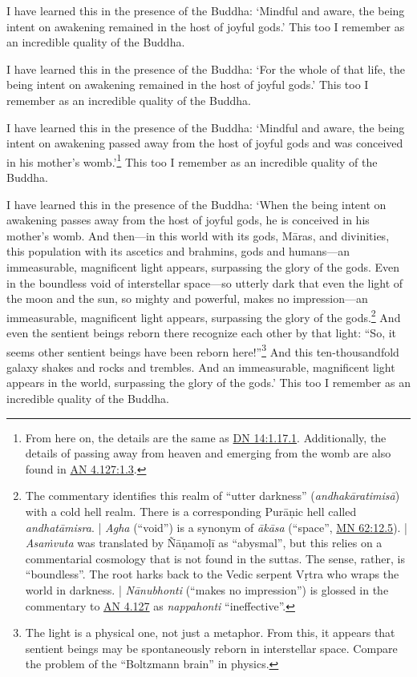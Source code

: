 \documentclass[12pt,openany]{book}%
\begin{document}
I have learned this in the presence of the Buddha: ‘Mindful and aware, the being intent on awakening remained in the host of joyful gods.’ This too I remember as an incredible quality of the Buddha. 

I have learned this in the presence of the Buddha: ‘For the whole of that life, the being intent on awakening remained in the host of joyful gods.’ This too I remember as an incredible quality of the Buddha. 

I have learned this in the presence of the Buddha: ‘Mindful and aware, the being intent on awakening passed away from the host of joyful gods and was conceived in his mother’s womb.’\footnote{From here on, the details are the same as \href{https://suttacentral.net/dn14/en/sujato\#1.17.1}{DN 14:1.17.1}. Additionally, the details of passing away from heaven and emerging from the womb are also found in \href{https://suttacentral.net/an4.127/en/sujato\#1.3}{AN 4.127:1.3}. } This too I remember as an incredible quality of the Buddha. 

I have learned this in the presence of the Buddha: ‘When the being intent on awakening passes away from the host of joyful gods, he is conceived in his mother’s womb. And then—in this world with its gods, \textsanskrit{Māras}, and divinities, this population with its ascetics and brahmins, gods and humans—an immeasurable, magnificent light appears, surpassing the glory of the gods. Even in the boundless void of interstellar space—so utterly dark that even the light of the moon and the sun, so mighty and powerful, makes no impression—an immeasurable, magnificent light appears, surpassing the glory of the gods.\footnote{The commentary identifies this realm of “utter darkness” (\textit{\textsanskrit{andhakāratimisā}}) with a cold hell realm. There is a corresponding \textsanskrit{Purāṇic} hell called \textit{\textsanskrit{andhatāmisra}}. | \textit{Agha} (“void”) is a synonym of \textit{\textsanskrit{ākāsa}} (“space”, \href{https://suttacentral.net/mn62/en/sujato\#12.5}{MN 62:12.5}). | \textit{\textsanskrit{Asaṁvuta}} was translated by \textsanskrit{Ñāṇamoḷī} as “abysmal”, but this relies on a commentarial cosmology that is not found in the suttas. The sense, rather, is “boundless”. The root harks back to the Vedic serpent \textsanskrit{Vṛtra} who wraps the world in darkness. | \textit{\textsanskrit{Nānubhonti}} (“makes no impression”) is glossed in the commentary to \href{https://suttacentral.net/an4.127/en/sujato}{AN 4.127} as \textit{nappahonti} “ineffective”. } And even the sentient beings reborn there recognize each other by that light: “So, it seems other sentient beings have been reborn here!”\footnote{The light is a physical one, not just a metaphor. From this, it appears that sentient beings may be spontaneously reborn in interstellar space. Compare the problem of the “Boltzmann brain” in physics. } And this ten-thousandfold galaxy shakes and rocks and trembles. And an immeasurable, magnificent light appears in the world, surpassing the glory of the gods.’ This too I remember as an incredible quality of the Buddha. 
\end{document}
